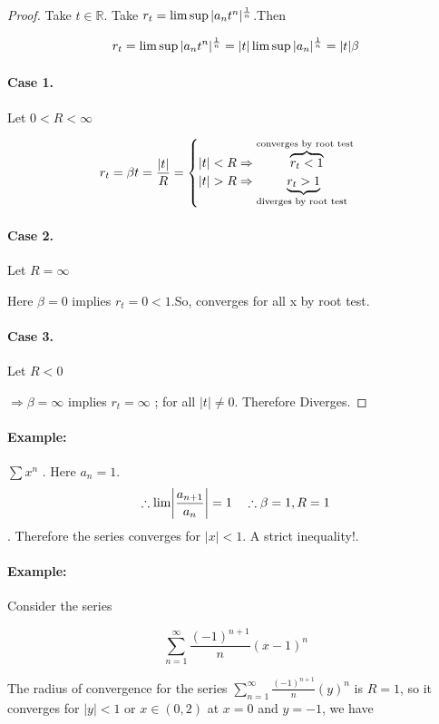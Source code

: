 \documentclass{notes}
\begin{document}
\begin{proof}
	Take $t \in \mathbb{R}$. Take $r_t = \limsup |a_n t^n|^{1 \over n}$.Then 
	
	$$
	r_t = \limsup |a_n t^n|^{1 \over n} = |t| \limsup|a_n|^{1 \over n}= |t|\beta
	$$
	
	\paragraph{Case 1.} Let $0<R<\infty$
	
	\begin{equation*}
	r_t = \beta t = {|t| \over R} = 
	\begin{cases}|t| < R \Rightarrow \overbrace{r_t < 1}^{\text{converges by root test }}\\
	|t| > R \Rightarrow \underbrace{r_t > 1}_{\text{diverges by root test }}
	\end{cases}
	\end{equation*}
	\paragraph{Case 2.} Let $R = \infty$
	
	Here $\beta = 0$ implies $r_t = 0 <1$.So, converges for all x by root test.
	
	\paragraph{Case 3.} Let $R<0$
	
	$\Rightarrow \beta = \infty$ implies $r_t = \infty$ ; for all $|t| \not = 0$.
	Therefore Diverges.
\end{proof}
\paragraph*{Example:}
$\sum x^n$ . Here $a_n =1$.
$$
\therefore \lim \abs{a_{n+1} \over a_n} = 1 \quad \therefore \beta = 1, R = 1$$.
Therefore the series converges for $|x| < 1$. A strict inequality!.

\paragraph{Example:}
Consider the series

$$ \sum_{n=1}^{\infty} \frac{(-1)^{n+1}}{n}(x-1)^n$$

The radius of convergence for the series $ \sum_{n=1}^{\infty} \frac{(-1)^{n+1}}{n}(y)^n$ is $R = 1$, so it converges for $|y|<1$ or $ x \in (0,2)$ at $x = 0$ and $y = -1$, we have
\end{document}
